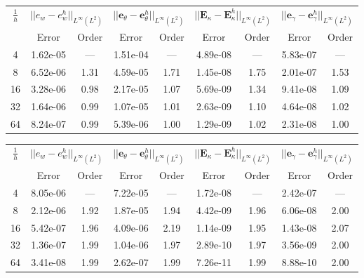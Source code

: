 \begin{table}[hp]
	\centering
	\begin{tabular}{ccccccccc}
		\hline 
		\multirow{2}{*}{$\frac{1}{h}$} & \multicolumn{2}{c}{$||e_w - e_w^h||_{L^{\infty}(L^2)}$}    & \multicolumn{2}{c}{$||\bm{e}_\theta - \bm{e}_\theta^h||_{L^{\infty}(L^2)}$} & \multicolumn{2}{c}{$||\bm{E}_\kappa - \bm{E}_\kappa^h||_{L^{\infty}(L^2)}$} & \multicolumn{2}{c}{$||\bm{e}_\gamma - \bm{e}_\gamma^ h||_{L^{\infty}(L^2)}$}   \\ 
		& Error & Order  & Error & Order  & Error & Order  & Error & Order   \\ 
		\hline 
		4  & 1.62e-05 & ---  & 1.51e-04 & ---  & 4.89e-08 & ---  & 5.83e-07 & --- \\ 
		8  & 6.52e-06 & 1.31 & 4.59e-05 & 1.71 & 1.45e-08 & 1.75 & 2.01e-07 & 1.53\\ 
		16 & 3.28e-06 & 0.98 & 2.17e-05 & 1.07 & 5.69e-09 & 1.34 & 9.41e-08 & 1.09\\ 
		32 & 1.64e-06 & 0.99 & 1.07e-05 & 1.01 & 2.63e-09 & 1.10 & 4.64e-08 & 1.02\\ 
		64 & 8.24e-07 & 0.99 & 5.39e-06 & 1.00 & 1.29e-09 & 1.02 & 2.31e-08 & 1.00\\ 
		\hline 
	\end{tabular} 
	\captionsetup{width=0.95\linewidth}
	\vspace{1mm}
	\label{tab:resminBTJ_k1}
\end{table}

\begin{table}[hp]
	\centering
	\begin{tabular}{ccccccccc}
		\hline 
		\multirow{2}{*}{$\frac{1}{h}$} & \multicolumn{2}{c}{$||e_w - e_w^h||_{L^{\infty}(L^2)}$}    & \multicolumn{2}{c}{$||\bm{e}_\theta - \bm{e}_\theta^h||_{L^{\infty}(L^2)}$} & \multicolumn{2}{c}{$||\bm{E}_\kappa - \bm{E}_\kappa^h||_{L^{\infty}(L^2)}$} & \multicolumn{2}{c}{$||\bm{e}_\gamma - \bm{e}_\gamma^ h||_{L^{\infty}(L^2)}$}   \\ 
		& Error & Order  & Error & Order  & Error & Order  & Error & Order   \\ 
		\hline 
		4  & 8.05e-06 & ---  & 7.22e-05 & ---  & 1.72e-08 & ---  & 2.42e-07 & --- \\ 
		8  & 2.12e-06 & 1.92 & 1.87e-05 & 1.94 & 4.42e-09 & 1.96 & 6.06e-08 & 2.00\\ 
		16 & 5.42e-07 & 1.96 & 4.09e-06 & 2.19 & 1.14e-09 & 1.95 & 1.43e-08 & 2.07\\ 
		32 & 1.36e-07 & 1.99 & 1.04e-06 & 1.97 & 2.89e-10 & 1.97 & 3.56e-09 & 2.00\\ 
		64 & 3.41e-08 & 1.99 & 2.62e-07 & 1.99 & 7.26e-11 & 1.99 & 8.88e-10 & 2.00\\ 
		\hline 
	\end{tabular} 
	\captionsetup{width=0.95\linewidth}
	\vspace{1mm}
	\label{tab:resminBTJ_k2}
\end{table}


